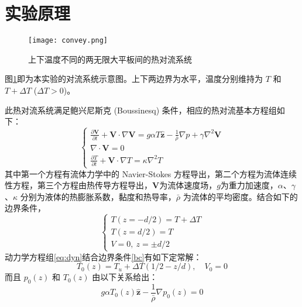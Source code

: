 \documentclass[aps,pre,12pt,preprint,onecolumn,showpacs,showkeys]{revtex4-1}
\def \V {\bm{V}}
\begin{document}
\section{实验原理}
	\begin{figure}[h]
	\centering
	\texttt{[image: convey.png]}
	\caption{\label{fig:convey}%
	上下温度不同的两无限大平板间的热对流系统}
	\end{figure}
	
	图\ref{fig:convey}即为本实验的对流系统示意图。上下两边界为水平，温度分别维持为 $T$ 和 $T+\Delta T$ ($\Delta T > 0$)。
	
	此热对流系统满足鲍兴尼斯克 (Boussinesq) 条件，相应的热对流基本方程组如下：
	\begin{equation}\label{eq:dyn}
		\left\{
		\begin{array}{c}
			\frac{\partial \V}{\partial t}+\V\cdot \nabla\V=g\alpha T \hat{\bm{z}}-\frac{1}{\bar\rho}\nabla p+\gamma \nabla^2 \V\\
			\nabla \cdot \V=0\\
			\frac{\partial T}{\partial t} + \V \cdot \nabla T = \kappa \nabla ^2 T
		\end{array}
		\right.
	\end{equation}
	其中第一个方程有流体力学中的 Navier-Stokes 方程导出，第二个方程为流体连续性方程，第三个方程由热传导方程导出，$\V$为流体速度场，$g$为重力加速度，$\alpha$、$\gamma$、$\kappa$ 分别为液体的热膨胀系数，黏度和热导率，$\bar \rho$ 为流体的平均密度。结合如下的边界条件，
	\begin{equation}\label{bc}
		\left\{
		\begin{array}{c}
			T(z=-d/2)=T+\Delta T \\
			T(z=d/2)=T\\
			V=0,\ z=\pm d/2
		\end{array}
		\right.
	\end{equation}
	动力学方程组\ref{eq:dyn}结合边界条件\ref{bc}有如下定常解：
	\begin{equation}
		T_0 (z)= T_u + \Delta T (1/2- z/d),\quad V_0 =0
	\end{equation}
	而且 $p_0 (z)$ 和 $T_0(z)$ 由以下关系给出：
	\begin{equation} \label{eq:4}
		g \alpha T_0 (z) \hat{\bm{z}} -\frac {1}{\bar \rho} \nabla p_0 (z) =0 
	\end{equation}
	
\end{document}
